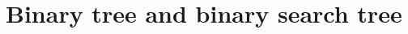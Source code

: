 \documentclass[openany]{book}
\begin{document}
% 

% 

\chapter{Binary tree and binary search tree}


\printbibliography
\end{document}
